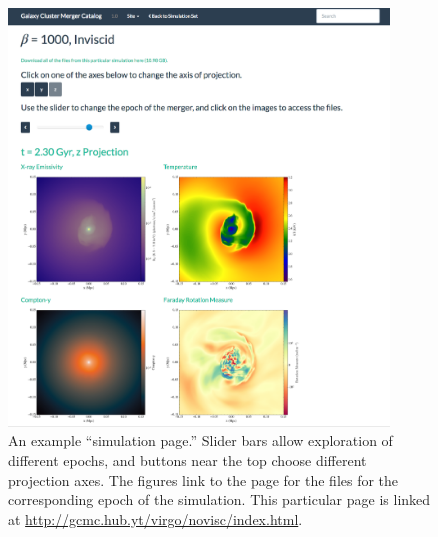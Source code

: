\documentclass{emulateapj}
\begin{document}
\begin{figure}
\begin{center}
\includegraphics[width=0.9\textwidth]{sim_page.eps}
\caption{An example ``simulation page.'' Slider bars allow exploration of different epochs, and buttons near the top choose different projection axes. The figures link to the page for the files for the corresponding epoch of the simulation. This particular page is linked at \url{http://gcmc.hub.yt/virgo/novisc/index.html}.}
\end{center}
\end{figure}
\end{document}
